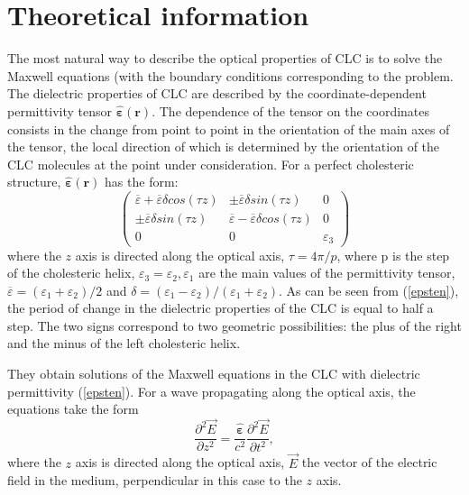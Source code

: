 \documentclass[a4paper, 12pt]{article}
\renewcommand{\epsilon}{\varepsilon}
\begin{document}
\section*{Theoretical information}
The most natural way to describe the optical properties of CLC is to solve the Maxwell equations (with the boundary conditions corresponding to the problem. The dielectric properties of CLC are described by the coordinate-dependent permittivity tensor  $\hat{\mathbf{\epsilon}} (\mathbf{r})$. The dependence of the tensor on the coordinates consists in the change from point to point in the orientation of the main axes of the tensor, the local direction of which is determined by the orientation of the CLC molecules at the point under consideration.
For a perfect cholesteric structure, $\hat{\mathbf{\epsilon}} (\mathbf{r})$ has the form:
\begin{equation}\label{epsten}
\begin{pmatrix}
\overline{\epsilon} +  \overline{\epsilon} \delta cos(\tau z)& \pm \overline{\epsilon} \delta sin(\tau z) & 0\\
\pm \overline{\epsilon} \delta sin(\tau z) & \overline{\epsilon} -  \overline{\epsilon} \delta cos(\tau z) & 0\\
0 & 0 & \epsilon_{3}
\end{pmatrix}
\end{equation}
where the $z$ axis is directed along the optical axis, $\tau = 4 \pi / p$, where p is the step of the cholesteric helix, $\epsilon_{3} = \epsilon_{2}, \epsilon_{1}$ are the main values of the permittivity tensor, $\overline{\epsilon} = (\epsilon_{1} + \epsilon_{2})/2$ and $\delta =  (\epsilon_{1} - \epsilon_{2})/(\epsilon_{1} + \epsilon_{2})$. As can be seen from (\ref{epsten}), the period of change in the dielectric properties of the CLC is equal to half a step. The two signs correspond to two geometric possibilities: the plus of the right and the minus of the left cholesteric helix.

They obtain solutions of the Maxwell equations in the CLC with dielectric permittivity (\ref{epsten}). For a wave propagating along the optical axis, the equations take the form 
\begin{equation}
\frac{\partial^{2} \overrightarrow{E}}{\partial z^{2}}=\frac{\hat{\mathbf{\epsilon}}}{c^{2}} \frac{\partial^{2} \overrightarrow{E}}{\partial t^{2}},	
\end{equation}
where the $z$ axis is directed along the optical axis, $\overrightarrow{E}$ the vector of the electric field in the medium, perpendicular in this case to the $z$ axis. 
\end{document}
